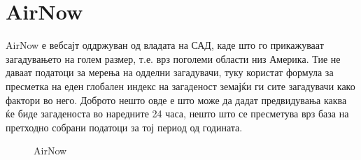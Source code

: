 \documentclass{uvamscse}
\begin{document}
\section{AirNow}
AirNow е вебсајт оддржуван од владата на САД, каде што го прикажуваат загадувањето на голем размер, т.е. врз поголеми области низ Америка. Тие не даваат податоци за мерења на одделни загадувачи, туку користат формула за пресметка на еден глобален индекс на загаденост земајќи ги сите загадувачи како фактори во него. Доброто нешто овде е што може да дадат предвидувања каква ќе биде загаденоста во наредните 24 часа, нешто што се пресметува врз база на претходно собрани податоци за тој период од годината.
\begin{figure}[H]
\centering
  \caption{AirNow}
  \label{fig:airnow}
\end{figure}
\end{document}
